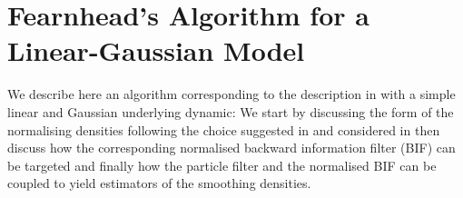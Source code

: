 
\section{\label{app:fearnhead-lg}Fearnhead's Algorithm for a Linear-Gaussian Model }
We describe here an algorithm corresponding to the description in \citep{fearnhead10} with a simple linear and Gaussian underlying dynamic:
%
We start by discussing the form of the normalising densities following the choice suggested in \citep{briers10} and considered in \citep{fearnhead10} then discuss how the corresponding normalised backward information filter (BIF) can be targeted and finally how the particle filter and the normalised BIF can be coupled to yield estimators of the smoothing densities.  
